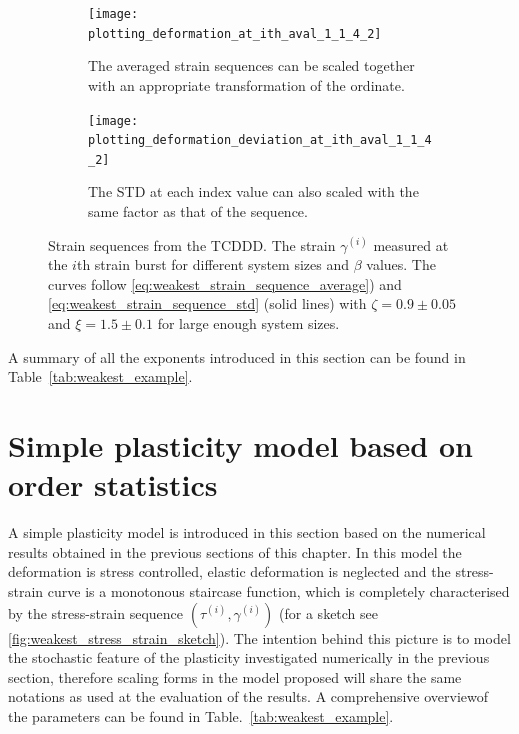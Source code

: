 \begin{figure}[htbp!] 
  \centering
  \begin{subfigure}[b]{0.48\textwidth}
    \texttt{[image: plotting\_deformation\_at\_ith\_aval\_1\_1\_4\_2]}
    \caption{The averaged strain sequences can be scaled together with an appropriate transformation of the ordinate.}
    \label{fig:weakest_gamma_i_CADDDa}   
  \end{subfigure}           \hspace{0.01\textwidth}
  \begin{subfigure}[b]{0.48\textwidth}
    \texttt{[image: plotting\_deformation\_deviation\_at\_ith\_aval\_1\_1\_4\_2]}
    \caption{The STD at each index value can also scaled with the same factor as that of the sequence.}
    \label{fig:weakest_gamma_i_CADDDb}   
  \end{subfigure}             
  \caption[Analysis of the strain sequences for SCPM]{Strain sequences from the TCDDD. The strain $\gamma^{(i)}$ measured at the $i$th strain burst for different system sizes and $\beta$ values. The curves follow \cref{eq:weakest_strain_sequence_average}) and \cref{eq:weakest_strain_sequence_std} (solid lines) with $\zeta=0.9 \pm 0.05$ and $\xi=1.5 \pm 0.1$ for large enough system sizes. }
  \label{fig:weakest_gamma_i_CADDD}
\end{figure}


A summary of all the exponents introduced in this section can be found in Table~\ref{tab:weakest_example}.

\section{Simple plasticity model based on order statistics} \label{sec:weakest_simple_plasticity_model}

A simple plasticity model is introduced in this section based on the numerical results obtained in the previous sections of this chapter. In this model the deformation is stress controlled, elastic deformation is neglected and the stress-strain curve is a monotonous staircase function, which is completely characterised by the stress-strain sequence $\left( {{\tau ^{\left( i \right)}},{\gamma ^{\left( i \right)}}} \right)$ (for a sketch see \ref{fig:weakest_stress_strain_sketch}). The intention behind this picture is to model the stochastic feature of the plasticity investigated numerically in the previous section, therefore scaling forms in the model proposed will share the same notations as used at the evaluation of the results. A comprehensive overviewof the parameters can be found in Table.~\ref{tab:weakest_example}.

